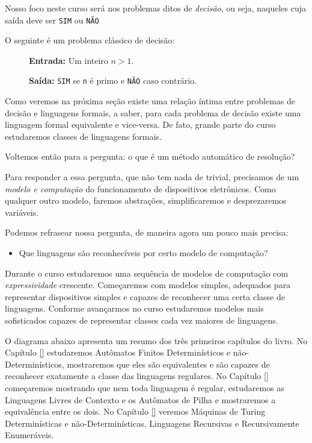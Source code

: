 Nosso foco neste curso será nos problemas ditos de {\em decisão}, ou seja, naqueles cuja saída deve ser {\tt SIM} ou {\tt NÃO}


\begin{example}
  O seguinte é um problema clássico de decisão:
  \begin{description}
  \item[] {\bf Entrada:} Um inteiro $n > 1$.
  \item[] {\bf Saída:} {\tt SIM} se {\tt n} é primo e {\tt NÃO} caso contrário.
  \end{description}
\end{example}

Como veremos na próxima seção existe uma relação íntima entre problemas de decisão e linguagens formais, a saber, para cada problema de decisão existe uma linguagem formal equivalente e vice-versa.
De fato, grande parte do curso estudaremos classes de linguagens formais.

Voltemos então para a pergunta: o que é um método automático de resolução?

Para responder a essa pergunta, que não tem nada de trivial, precisamos de um {\em modelo e computação} do funcionamento de dispositivos eletrônicos. 
Como qualquer outro modelo, faremos abstrações, simplificaremos e desprezaremos variáveis.

Podemos refrasear nossa pergunta, de maneira agora um pouco mais precisa:
\begin{itemize}
\item Que linguagens são reconhecíveis por certo modelo de computação?
\end{itemize}

Durante o curso estudaremos uma sequência de modelos de computação com {\em expressividade} crescente.
Começaremos com modelos simples, adequados para representar dispositivos simples e capazes de reconhecer uma certa classe de linguagens.
Conforme avançarmos no curso estudaremos modelos mais sofisticados capazes de representar classes cada vez maiores de linguagens.

O diagrama abaixo apresenta um resumo dos três primeiros capítulos do livro.
No Capítulo \ref{} estudaremos Autômatos Finitos Determinísticos e não-Determinísticos, mostraremos que eles são equivalentes e são capazes de reconhecer exatamente a classe das linguagens regulares.
No Capítulo \ref{} começaremos mostrando que nem toda linguagem é regular, estudaremos as Linguagens Livres de Contexto e os Autômatos de Pilha e mostraremos a equivalência entre os dois. 
No Capítulo \ref{} veremos Máquinas de Turing Determinísticas e não-Determinísticas, Linguagens Recursivas e Recursivamente Enumeráveis.

